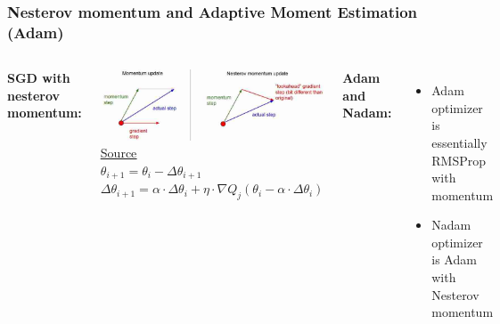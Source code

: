 \documentclass[12pt, aspectratio = 169]{beamer}
\begin{document}
\begin{frame}
	\frametitle{Nesterov momentum and Adaptive Moment Estimation (Adam)}
	\begin{columns}[T]
	    \begin{minipage}[t]{\linewidth}
	        \centering
	        \begin{center}
	            \textbf{SGD with nesterov momentum:}
            \end{center}
	        \includegraphics[width=1.0\linewidth]{nesterov.png}\\
		    \href{https://mc.ai/ml-advancedmomentum-in-machine-learning-what-is-nesterov-momentum/}{\color{blue}\uline{Source}}\\
		    $\theta_{i+1} = \theta_i - \Delta \theta_{i+1}$\\
		    $\Delta \theta_{i+1} = \alpha \cdot \Delta \theta_i + \eta \cdot \nabla Q_j(\theta_i - \alpha \cdot \Delta \theta_i)$\\
        \end{minipage}
    	\begin{minipage}[t]{\linewidth}
    	    \centering
    	    \begin{center}
	            \textbf{Adam and Nadam:}
            \end{center}
            \hfill \break
            \begin{itemize}
                \item Adam optimizer is essentially RMSProp with momentum
                \item Nadam optimizer is Adam with Nesterov momentum
            \end{itemize}
        \end{minipage}
    \end{columns}
\end{frame}

\end{document}
